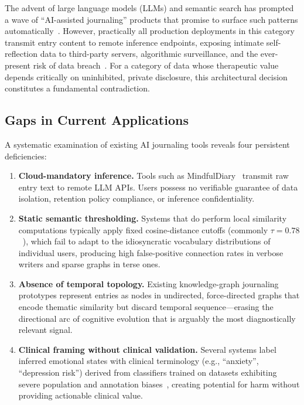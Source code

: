\documentclass[12pt, letterpaper]{article}
\begin{document}
The advent of large language models (LLMs) and semantic search
has prompted a wave of ``AI-assisted journaling'' products that
promise to surface such patterns
automatically~\cite{xu2023mindfuldiary}.
However, practically all production deployments in this category
transmit entry content to remote inference endpoints, exposing
intimate self-reflection data to third-party servers,
algorithmic surveillance, and the ever-present risk of data
breach~\cite{feretzakis2024}.
For a category of data whose therapeutic value depends
critically on uninhibited, private disclosure, this
architectural decision constitutes a fundamental contradiction.

\subsection*{Gaps in Current Applications}

A systematic examination of existing AI journaling tools
reveals four persistent deficiencies:

\begin{enumerate}

  \item \textbf{Cloud-mandatory inference.}
    Tools such as MindfulDiary~\cite{xu2023mindfuldiary}
    transmit raw entry text to remote LLM APIs.
    Users possess no verifiable guarantee of data isolation,
    retention policy compliance, or inference confidentiality.

  \item \textbf{Static semantic thresholding.}
    Systems that do perform local similarity computations
    typically apply fixed cosine-distance cutoffs (commonly
    $\tau = 0.78$~\cite{tauscher2023}), which fail to adapt
    to the idiosyncratic vocabulary distributions of individual
    users, producing high false-positive connection rates in
    verbose writers and sparse graphs in terse ones.

  \item \textbf{Absence of temporal topology.}
    Existing knowledge-graph journaling prototypes represent
    entries as nodes in undirected, force-directed graphs that
    encode thematic similarity but discard temporal
    sequence---erasing the directional arc of cognitive
    evolution that is arguably the most diagnostically relevant
    signal.

  \item \textbf{Clinical framing without clinical validation.}
    Several systems label inferred emotional states with
    clinical terminology (e.g., ``anxiety'', ``depression
    risk'') derived from classifiers trained on datasets
    exhibiting severe population and annotation
    biases~\cite{sage2025}, creating potential for harm without
    providing actionable clinical value.

\end{enumerate}
\end{document}
